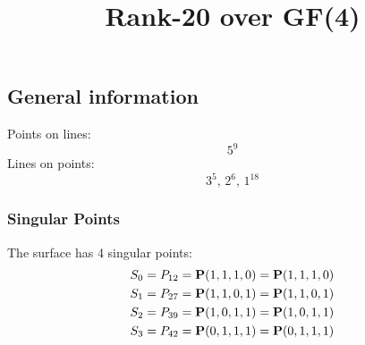 \documentclass{article}
\newcommand\setTBstruts{\def\T{\rule{0pt}{2.6ex}}%
\def\B{\rule[-1.2ex]{0pt}{0pt}}}
\newcommand{\bP}{{\bf P}}
\begin{document}
 
\setTBstruts



{\allowdisplaybreaks%






\title{Rank-20 over GF(4)}
\author{}%
\maketitle%
%
{}



\subsection*{General information}
Points on lines:
$$
5^9$$
Lines on points:
$$
3^5,\,2^6,\,1^{18}$$
\subsubsection*{Singular Points}
The surface has 4 singular points:\\
\begin{align*}
S_{0} &= P_{12}=\bP(1, 1, 1, 0) = \bP(1, 1, 1, 0)\\
S_{1} &= P_{27}=\bP(1, 1, 0, 1) = \bP(1, 1, 0, 1)\\
S_{2} &= P_{39}=\bP(1, 0, 1, 1) = \bP(1, 0, 1, 1)\\
S_{3} &= P_{42}=\bP(0, 1, 1, 1) = \bP(0, 1, 1, 1)\\
\end{align*}
}
\end{document}
